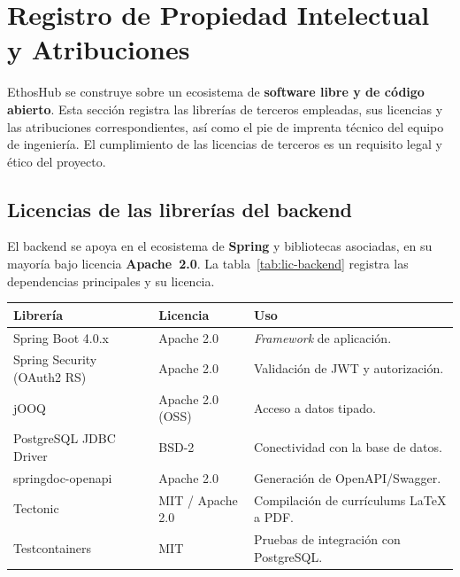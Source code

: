 \section{Registro de Propiedad Intelectual y Atribuciones}
\label{sec:propiedad}

EthosHub se construye sobre un ecosistema de \textbf{software libre y de código abierto}.
Esta sección registra las librerías de terceros empleadas, sus licencias y las
atribuciones correspondientes, así como el pie de imprenta técnico del equipo de
ingeniería. El cumplimiento de las licencias de terceros es un requisito legal y ético del
proyecto.

\subsection{Licencias de las librerías del backend}
\label{subsec:lic_backend}

El backend se apoya en el ecosistema de \textbf{Spring} y bibliotecas asociadas, en su
mayoría bajo licencia \textbf{Apache~2.0}. La tabla~\ref{tab:lic-backend} registra las
dependencias principales y su licencia.

\vspace{0.2cm}
\noindent
\renewcommand{\arraystretch}{1.3}
\fontsize{8.5}{10.2}\selectfont\sffamily
\begin{tabularx}{\textwidth}{|L{4.4cm}|C{2.6cm}|Y|}
\hline
{}
\sffamily\textbf{Librería} & \sffamily\textbf{Licencia} & \sffamily\textbf{Uso} \\
\hline
Spring Boot 4.0.x & Apache 2.0 & \textit{Framework} de aplicación. \\ \hline
{}
Spring Security (OAuth2 RS) & Apache 2.0 & Validación de JWT y autorización. \\ \hline
jOOQ & Apache 2.0 \scriptsize(OSS) & Acceso a datos tipado. \\ \hline
{}
PostgreSQL JDBC Driver & BSD-2 & Conectividad con la base de datos. \\ \hline
springdoc-openapi & Apache 2.0 & Generación de OpenAPI/Swagger. \\ \hline
{}
Tectonic & MIT / Apache 2.0 & Compilación de currículums LaTeX a PDF. \\ \hline
Testcontainers & MIT & Pruebas de integración con PostgreSQL. \\ \hline
\end{tabularx}
\label{tab:lic-backend}

